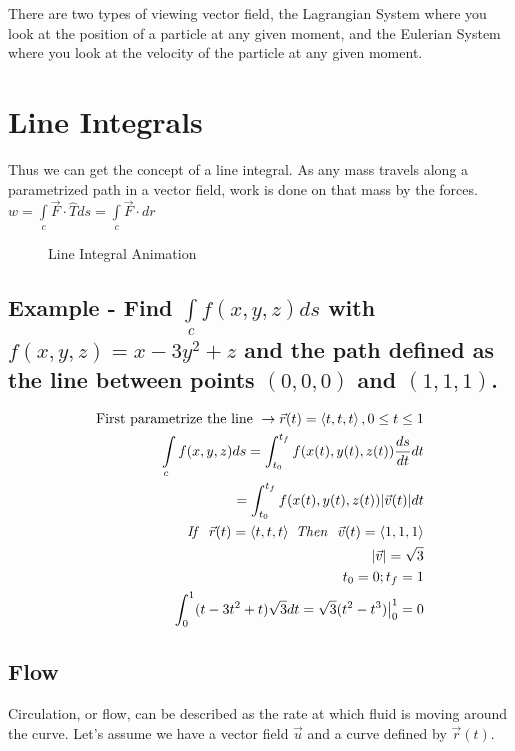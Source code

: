\documentclass{article}
\newcommand{\nvec}[1]{\left\langle #1 \right\rangle}
\begin{document}
There are two types of viewing vector field, the Lagrangian System where you look at the position of a particle at any given moment, and the Eulerian System where you look at the velocity of the particle at any given moment.

\section{Line Integrals}

Thus we can get the concept of a line integral. As any mass travels along a parametrized path in a vector field, work is done on that mass by the forces. $ w = \int\limits_c \vec{F} \cdot \hat{T} ds = \int\limits_c \vec{F} \cdot dr$

\begin{figure}
\centering
\caption{Line Integral Animation}
\end{figure}

    \subsection{Example - Find $\int\limits_cf(x,y,z)ds$ with $f(x,y,z)=x-3y^2+z$ and the path defined as the line between points $(0,0,0)$ and $(1,1,1)$.}
    \[
    \begin{aligned}
    \text{First parametrize the line } \to \vec{r}(t)=\nvec{t,t,t}, 0 \le t \le 1\\
    \int\limits_c f(x,y,z)ds = \int_{t_0}^{t_f} f(x(t), y(t), z(t)) \frac{ds}{dt} dt\\
    = \int_{t_0}^{t_f} f(x(t), y(t), z(t)) |\vec{v}(t)| dt\\
    \text{\textit{If } } \vec{r}(t) = \nvec{t,t,t} \text{\textit{ Then } } \vec{v}(t) = \nvec{1,1,1}\\
    |\vec{v}|=\sqrt{3}\\
    t_0 = 0; t_f = 1\\
    \int_0^1(t-3t^2+t)\sqrt{3}dt = \sqrt{3}(t^2-t^3)\big{\vert}_0^1=0
    \end{aligned}
    \]

    \subsection{Flow}
    Circulation, or flow, can be described as the rate at which fluid is moving around the curve. Let's assume we have a vector field $\vec{u}$ and a curve defined by $\vec{r}(t)$.
\end{document}
